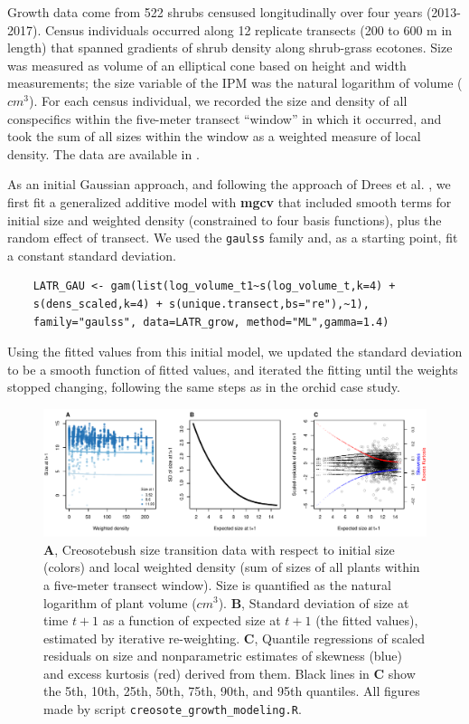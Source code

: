\documentclass[12pt]{article}
\begin{document}
Growth data come from 522 shrubs censused longitudinally over four years (2013-2017). 
Census individuals occurred along 12 replicate transects (200 to 600 m in length) that spanned gradients of shrub density along shrub-grass ecotones. 
Size was measured as volume of an elliptical cone based on height and width measurements; the size variable of the IPM was the natural logarithm of volume ($cm^3$). 
For each census individual, we recorded the size and density of all conspecifics within the five-meter transect ``window'' in which it occurred, and took the sum of all sizes within the window as a weighted measure of local density. 
The data are available in \cite{shrubdata}. 

As an initial Gaussian approach, and following the approach of Drees et al. \citeyear{drees2023demography}, we first fit a generalized additive model with \textbf{mgcv} that included smooth terms for initial size and weighted density (constrained to four basis functions), plus the random effect of transect. 
We used the \texttt{gaulss} family and, as a starting point, fit a constant standard deviation. 
\begin{lstlisting}
	LATR_GAU <- gam(list(log_volume_t1~s(log_volume_t,k=4) + 
	s(dens_scaled,k=4) + s(unique.transect,bs="re"),~1), 
	family="gaulss", data=LATR_grow, method="ML",gamma=1.4) 
\end{lstlisting}
Using the fitted values from this initial model, we updated the standard deviation to be a smooth function of fitted values, and iterated the fitting until the weights stopped changing, following the same steps as in the orchid case study. 

\begin{figure}[tbp]
	\centering
	\includegraphics[width=1.0\textwidth]{figures/creosote_diagnostics.pdf}
	\caption{\textbf{A}, Creosotebush size transition data with respect to initial size (colors) and local weighted density (sum of sizes of all plants within a five-meter transect window). Size is quantified as the natural logarithm of plant volume ($cm^3$). \textbf{B}, Standard deviation of size at time $t+1$ as a function of expected size at $t+1$ (the fitted values), estimated by iterative re-weighting. \textbf{C}, Quantile regressions of scaled residuals on size and nonparametric estimates of skewness (blue) and excess kurtosis (red) derived from them. Black lines in \textbf{C} show the 5th, 10th, 25th, 50th, 75th, 90th, and 95th quantiles. All figures made by script \texttt{creosote\_growth\_modeling.R}.}
	\label{fig:creosote_diagnostics}
\end{figure} 
\end{document}

